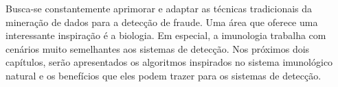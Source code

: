 Busca-se constantemente aprimorar e adaptar as técnicas tradicionais da mineração de dados para a detecção de fraude. Uma área que oferece uma interessante inspiração é a biologia. Em especial, a imunologia trabalha com cenários muito semelhantes aos sistemas de detecção. Nos próximos dois capítulos, serão apresentados os algoritmos inspirados no sistema imunológico natural e os benefícios que eles podem trazer para os sistemas de detecção.

